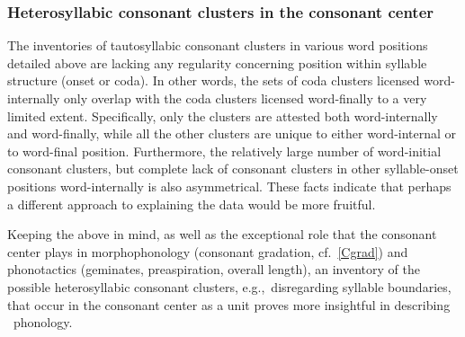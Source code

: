 \subsubsection[Heterosyllabic CCs in the consonant center]{Heterosyllabic consonant clusters in the consonant center}\label{consecutiveCs}
The inventories of tautosyllabic consonant clusters in various word positions detailed above are lacking any regularity concerning position within syllable structure (onset or coda). In other words, the sets of coda clusters licensed word-internally only overlap with the coda clusters licensed word-finally to a very limited extent. Specifically, only the clusters  are attested both word-internally and word-finally, while all the other clusters are unique to either word-internal or to word-final position. 
Furthermore, the relatively large number of word-initial consonant clusters, but complete lack of consonant clusters in other syllable-onset positions word-internally is also asymmetrical. 
These facts indicate that perhaps a different approach to explaining the data would be more fruitful. 

Keeping the above in mind, as well as the exceptional role that the consonant center plays in morphophonology (consonant gradation, cf.~\SEC\ref{Cgrad}) and phonotactics (geminates, preaspiration, overall length), an inventory of the possible heterosyllabic consonant clusters, e.g.,~disregarding syllable boundaries, that occur in the consonant center as a unit proves more insightful in describing \PS\ phonology. 

